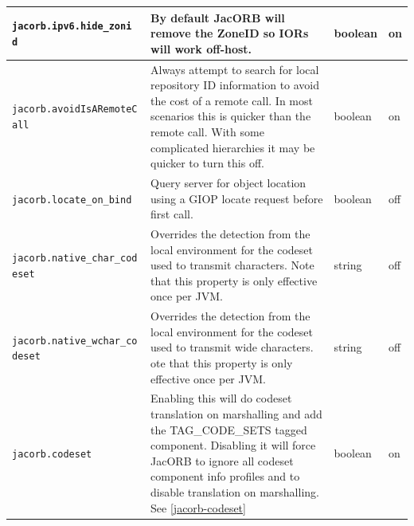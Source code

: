 \begin{small}
\begin{longtable}{|p{5cm}|p{7.5cm}|p{1.5cm}|p{1.5cm}|}
\hline
\verb"jacorb.ipv6.hide_zoni"
\verb"d" &
By default JacORB will remove the ZoneID so IORs will work off-host. & boolean & on\\
\hline
\verb"jacorb.avoidIsARemoteC"
\verb"all" & Always attempt to search for local repository ID information to avoid
the cost of a remote call. In most scenarios this is quicker than the remote call.
With some complicated hierarchies it may be quicker to turn this off. & boolean & on\\
\hline
\verb"jacorb.locate_on_bind " & Query server for object location using a GIOP locate
request before first call. & boolean & off\\
\hline
\verb"jacorb.native_char_cod"
\verb"eset" & Overrides the detection from the local environment for the codeset
used to transmit characters. Note that this property is only effective once per
JVM. & string & off\\
\hline
\verb"jacorb.native_wchar_co"
\verb"deset" & Overrides the detection from the local environment for the codeset
used to transmit wide characters. ote that this property is only effective once per
JVM. & string & off\\
\hline
\verb"jacorb.codeset" &
Enabling this will do codeset translation on marshalling and add the TAG\_CODE\_SETS tagged
component. Disabling it will force JacORB to ignore all codeset component info profiles and
to disable translation on marshalling. See \ref{jacorb-codeset} & boolean & on\\
\hline
\end{longtable}
\end{small}

